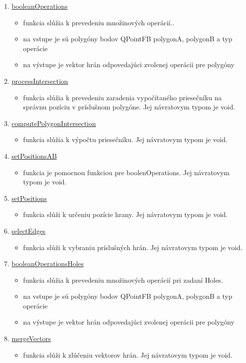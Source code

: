 \documentclass[12pt]{article}
\begin{document}
\begin{enumerate}
\item[] \underline{booleanOperations}
\begin{itemize}
\item funkcia slúžia k prevedeniu množinových operácií.. 
\item na vstupe je sú polygóny bodov QPointFB polygonA, polygonB a typ operácie 
\item na výstupe je vektor hrán odpovedajúci zvolenej operácii pre polygóny
\end{itemize}


\item[] \underline{processIntersection}
\begin{itemize}
\item funkcia slúžia k prevedeniu zaradenia vypočítaného priesečníku na správnu pozíciu v príslušnom polygóne. Jej návratovym typom je void. 
\end{itemize}


\item[] \underline{computePolygonIntersection}
\begin{itemize}
\item funkcia slúžia k výpočtu priesečníku. Jej návratovym typom je void. 
\end{itemize}


\item[] \underline{setPositionsAB}
\begin{itemize}
\item funkcia je pomocnou funkciou pre boolenOperations. Jej návratovym typom je void. 
\end{itemize}


\item[] \underline{setPositions}
\begin{itemize}
\item funkcia slúži k určeniu pozície hrany. Jej návratovym typom je void. 
\end{itemize}


\item[] \underline{selectEdges}
\begin{itemize}
\item funkcia slúži k vybraniu príslušných hrán. Jej návratovym typom je void. 
\end{itemize}


\item[] \underline{booleanOperationsHoles}
\begin{itemize}
\item funkcia slúžia k prevedeniu množinových operácií pri zadaní Holes. 
\item na vstupe je sú polygóny bodov QPointFB polygonA, polygonB a typ operácie 
\item na výstupe je vektor hrán odpovedajúci zvolenej operácii pre polygóny
\end{itemize}


\item[] \underline{mergeVectors}
\begin{itemize}
\item funkcia slúži k zlúčeniu vektorov hrán. Jej návratovym typom je void. 
\end{itemize}
\end{enumerate}
\end{document}
